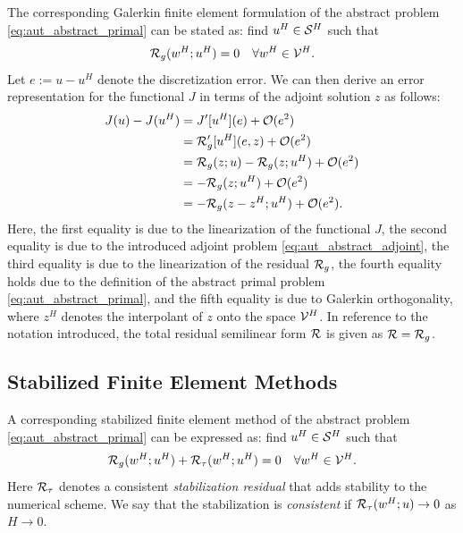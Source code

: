 The corresponding Galerkin finite element formulation of the abstract
problem \eqref{eq:aut_abstract_primal} can be stated as: find
$u^H \in \S^H$ such that
%
\begin{gather}
\R_g(w^H; u^H) = 0 \quad \forall w^H \in \V^H.
\label{eq:aut_abstract_fem}
\end{gather}
%
Let $e := u-u^H$ denote the discretization error. We can then derive an
error representation for the functional $J$ in terms of the adjoint solution
$z$ as follows:
%
\begin{gather}
\begin{aligned}
J(u) - J(u^H) &= J'[u^H](e) + \O(e^2) \\
&= \R_g'[u^H](e, z) + \O(e^2) \\
&= \R_g(z; u) - \R_g(z; u^H) + \O(e^2) \\
&= - \R_g(z; u^H) + \O(e^2) \\
&= - \R_g(z - z^H; u^H) + \O(e^2).
\end{aligned}
\label{eq:aut_abstract_galerkin_error}
\end{gather}
%
Here, the first equality is due to the linearization \cite{becker2001optimal}
of the functional $J$, the second equality is due to the introduced adjoint
problem \eqref{eq:aut_abstract_adjoint}, the third equality is due to the
linearization \cite{becker2001optimal} of the residual $\R_g$, the fourth
equality holds due to the definition of the abstract primal problem
\eqref{eq:aut_abstract_primal}, and the fifth equality is due to Galerkin
orthogonality, where $z^H$ denotes the interpolant of $z$ onto the space
$\V^H$. In reference to the notation introduced, the
total residual semilinear form $\R$ is given as $\R = \R_g$.

\subsection{Stabilized Finite Element Methods}

A corresponding stabilized finite element method of the abstract problem
\eqref{eq:aut_abstract_primal} can be expressed as: find $u^H \in \S^H$ such
that
%
\begin{gather}
\R_g(w^H; u^H) + \R_{\tau}(w^H; u^H) = 0 \quad \forall w^H \in \V^H.
\label{eq:aut_abstract_stabilized_fem}
\end{gather}
%
Here $\R_{\tau}$ denotes a consistent \emph{stabilization residual} that adds
stability to the numerical scheme. We say that the
stabilization is \emph{consistent} if $\R_{\tau}(w^H ; u) \to 0$ as
$H \to 0$.

